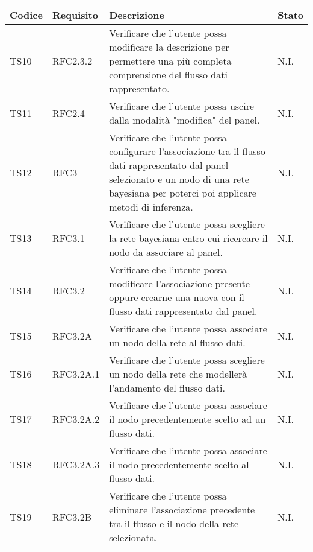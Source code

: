 \begin{table}[!htpb]
	\centering
	\renewcommand{\arraystretch}{2} 
	\begin{tabular}{|l|l|p{10cm}|l|}
		\rowcolor{orange!50}
		\hline
		\textbf{Codice} & \textbf{Requisito}& \textbf{Descrizione} & \textbf{Stato}\\ 
		\hline
		TS10 & RFC2.3.2 &
			Verificare che l'utente possa modificare la descrizione per permettere una più completa comprensione del flusso dati rappresentato.
			& N.I.\\
		\hline
		TS11 & RFC2.4 	&
			Verificare che l'utente possa uscire dalla modalità "modifica" del panel.
			& N.I.\\
		\hline
		TS12 & RFC3 	&
			Verificare che l’utente possa configurare l'associazione tra il flusso dati rappresentato dal panel selezionato e un nodo di una rete bayesiana per poterci poi applicare metodi di inferenza.
			& N.I.\\
		\hline
		TS13 & RFC3.1 	&
			Verificare che l'utente possa scegliere la rete bayesiana entro cui ricercare il nodo da associare al panel.
			& N.I.\\
		\hline
		TS14 & RFC3.2 	&
			Verificare che l'utente possa modificare l’associazione presente oppure crearne una nuova con il flusso dati rappresentato dal panel.
			& N.I.\\
		\hline
		TS15 & RFC3.2A &
			Verificare che l’utente possa associare un nodo della rete al flusso dati.
			& N.I.\\
		\hline
		TS16 & RFC3.2A.1 &
			Verificare che l'utente possa scegliere un nodo della rete che modellerà l’andamento del flusso dati. 
			& N.I.\\
		\hline		
		TS17 & RFC3.2A.2 &
			Verificare che l'utente possa associare il nodo precedentemente scelto ad un flusso dati.
			& N.I.\\
		\hline
		TS18 & RFC3.2A.3 &
			Verificare che l'utente possa associare il nodo precedentemente scelto al flusso dati.
			& N.I.\\
		\hline
		TS19 & RFC3.2B &
			Verificare che l’utente possa eliminare l'associazione precedente tra il flusso e il nodo della rete selezionata.
			& N.I.\\
		\hline
	\end{tabular}
\end{table}
